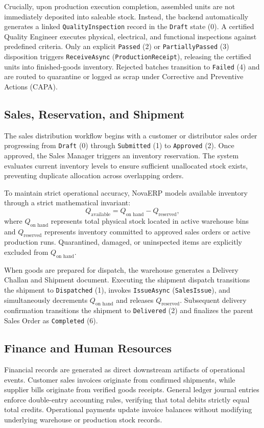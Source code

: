 \documentclass[conference]{IEEEtran}
\begin{document}
Crucially, upon production execution completion, assembled units are not immediately deposited into saleable stock. Instead, the backend automatically generates a linked \texttt{QualityInspection} record in the \texttt{Draft} state (0). A certified Quality Engineer executes physical, electrical, and functional inspections against predefined criteria. Only an explicit \texttt{Passed} (2) or \texttt{PartiallyPassed} (3) disposition triggers \texttt{ReceiveAsync} (\texttt{ProductionReceipt}), releasing the certified units into finished-goods inventory. Rejected batches transition to \texttt{Failed} (4) and are routed to quarantine or logged as scrap under Corrective and Preventive Actions (CAPA).

\subsection{Sales, Reservation, and Shipment}
The sales distribution workflow begins with a customer or distributor sales order progressing from \texttt{Draft} (0) through \texttt{Submitted} (1) to \texttt{Approved} (2). Once approved, the Sales Manager triggers an inventory reservation. The system evaluates current inventory levels to ensure sufficient unallocated stock exists, preventing duplicate allocation across overlapping orders.

To maintain strict operational accuracy, NovaERP models available inventory through a strict mathematical invariant:
\begin{equation}
Q_{\text{available}} = Q_{\text{on hand}} - Q_{\text{reserved}},
\label{eq:available_stock}
\end{equation}
where $Q_{\text{on hand}}$ represents total physical stock located in active warehouse bins and $Q_{\text{reserved}}$ represents inventory committed to approved sales orders or active production runs. Quarantined, damaged, or uninspected items are explicitly excluded from $Q_{\text{on hand}}$. 

When goods are prepared for dispatch, the warehouse generates a Delivery Challan and Shipment document. Executing the shipment dispatch transitions the shipment to \texttt{Dispatched} (1), invokes \texttt{IssueAsync} (\texttt{SalesIssue}), and simultaneously decrements $Q_{\text{on hand}}$ and releases $Q_{\text{reserved}}$. Subsequent delivery confirmation transitions the shipment to \texttt{Delivered} (2) and finalizes the parent Sales Order as \texttt{Completed} (6).

\subsection{Finance and Human Resources}
Financial records are generated as direct downstream artifacts of operational events. Customer sales invoices originate from confirmed shipments, while supplier bills originate from verified goods receipts. General ledger journal entries enforce double-entry accounting rules, verifying that total debits strictly equal total credits. Operational payments update invoice balances without modifying underlying warehouse or production stock records. 
\end{document}

